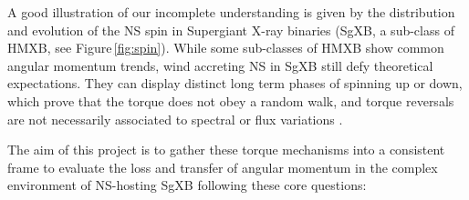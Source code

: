 \documentclass[letterpaper,12pt,onecolumn]{article}
\makeatletter
\newcommand{\sgx}{SgXB\xspace}
\newcommand*{\hmxb}{HMXB\@\xspace}
\newcommand*{\ns}{NS\@\xspace}
\newcommand*{\bh}{BH\@\xspace}
\makeatother
\begin{document}

A good illustration of our incomplete understanding is given by the distribution and evolution of the \ns spin in Supergiant X-ray binaries (\sgx, a sub-class of \hmxb, see Figure\,\ref{fig:spin}). While some sub-classes of \hmxb show common angular momentum trends, wind accreting \ns in \sgx still defy theoretical expectations. They can display distinct long term phases of spinning up or down, which prove that the torque does not obey a random walk, and torque reversals are not necessarily associated to spectral or flux variations \citep{Hemphill2013}. 


The aim of this project is to gather these torque mechanisms into a consistent frame to evaluate the loss and transfer of angular momentum in the complex environment of \ns-hosting \sgx following these core questions:






\end{document}
